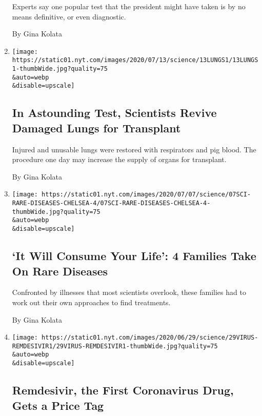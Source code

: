 \begin{enumerate}
  Experts say one popular test that the president might have taken is by
  no means definitive, or even diagnostic.

  By Gina Kolata
\item
  \href{/2020/07/13/health/organ-transplants-lungs.html}{}

  \texttt{[image: https://static01.nyt.com/images/2020/07/13/science/13LUNGS1/13LUNGS1-thumbWide.jpg?quality=75\\\&auto=webp\\\&disable=upscale]}

  \hypertarget{in-astounding-test-scientists-revive-damaged-lungs-for-transplant}{%
  \subsection{In Astounding Test, Scientists Revive Damaged Lungs for
  Transplant}\label{in-astounding-test-scientists-revive-damaged-lungs-for-transplant}}

  Injured and unusable lungs were restored with respirators and pig
  blood. The procedure one day may increase the supply of organs for
  transplant.

  By Gina Kolata
\item
  \href{/2020/07/07/health/rare-diseases.html}{}

  \texttt{[image: https://static01.nyt.com/images/2020/07/07/science/07SCI-RARE-DISEASES-CHELSEA-4/07SCI-RARE-DISEASES-CHELSEA-4-thumbWide.jpg?quality=75\\\&auto=webp\\\&disable=upscale]}

  \hypertarget{it-will-consume-your-life-4-families-take-on-rare-diseases}{%
  \subsection{`It Will Consume Your Life': 4 Families Take On Rare
  Diseases}\label{it-will-consume-your-life-4-families-take-on-rare-diseases}}

  Confronted by illnesses that most scientists overlook, these families
  had to work out their own approaches to find treatments.

  By Gina Kolata
\item
  \href{/2020/06/29/health/coronavirus-remdesivir-gilead.html}{}

  \texttt{[image: https://static01.nyt.com/images/2020/06/29/science/29VIRUS-REMDESIVIR1/29VIRUS-REMDESIVIR1-thumbWide.jpg?quality=75\\\&auto=webp\\\&disable=upscale]}

  \hypertarget{remdesivir-the-first-coronavirus-drug-gets-a-price-tag}{%
  \subsection{Remdesivir, the First Coronavirus Drug, Gets a Price
  Tag}\label{remdesivir-the-first-coronavirus-drug-gets-a-price-tag}}


\end{enumerate}
